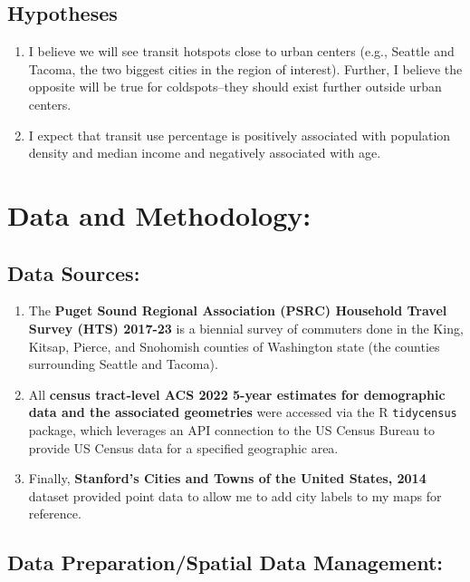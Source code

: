 \documentclass[
]{article}
\providecommand{\tightlist}{%
  \setlength{\itemsep}{0pt}\setlength{\parskip}{0pt}}
\begin{document}
\subsection{Hypotheses}\label{hypotheses}

\begin{enumerate}
\def\labelenumi{\arabic{enumi}.}
\tightlist
\item
  I believe we will see transit hotspots close to urban centers (e.g.,
  Seattle and Tacoma, the two biggest cities in the region of interest).
  Further, I believe the opposite will be true for coldspots--they
  should exist further outside urban centers.
\item
  I expect that transit use percentage is positively associated with
  population density and median income and negatively associated with
  age.
\end{enumerate}

\section{Data and Methodology:}\label{data-and-methodology}

\subsection{Data Sources:}\label{data-sources}

\begin{enumerate}
\def\labelenumi{\arabic{enumi}.}
\tightlist
\item
  The \textbf{Puget Sound Regional Association (PSRC) Household Travel
  Survey (HTS) 2017-23} is a biennial survey of commuters done in the
  King, Kitsap, Pierce, and Snohomish counties of Washington state (the
  counties surrounding Seattle and Tacoma).
\item
  All \textbf{census tract-level ACS 2022 5-year estimates for
  demographic data and the associated geometries} were accessed via the
  R \texttt{tidycensus} package, which leverages an API connection to
  the US Census Bureau to provide US Census data for a specified
  geographic area.
\item
  Finally, \textbf{Stanford's Cities and Towns of the United States,
  2014} dataset provided point data to allow me to add city labels to my
  maps for reference.
\end{enumerate}

\subsection{Data Preparation/Spatial Data
Management:}\label{data-preparationspatial-data-management}
\end{document}
